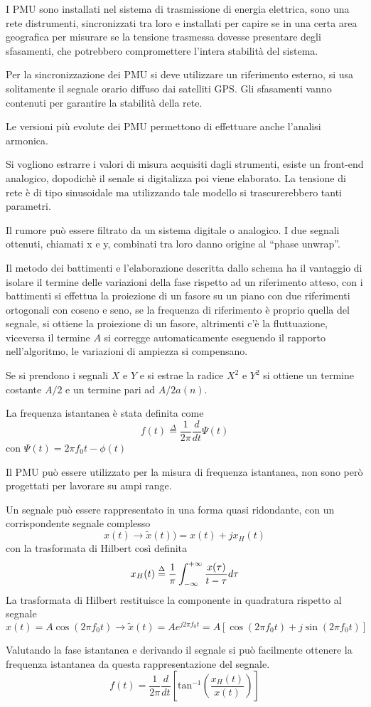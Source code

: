 I PMU sono installati nel sistema di trasmissione di energia elettrica, sono
una rete distrumenti, sincronizzati tra loro e installati per capire se in una
certa area geografica per misurare se la tensione trasmessa dovesse presentare
degli sfasamenti, che potrebbero compromettere l'intera stabilità del sistema.

Per la sincronizzazione dei PMU si deve utilizzare un riferimento esterno, si
usa solitamente il segnale orario diffuso dai satelliti GPS.
Gli sfasamenti vanno contenuti per garantire la stabilità della rete.

Le versioni più evolute dei PMU permettono di effettuare anche l'analisi
armonica.

Si vogliono estrarre i valori di misura acquisiti dagli strumenti, esiste un
front-end analogico, dopodichè il senale si digitalizza poi viene elaborato.
La tensione di rete è di tipo sinusoidale ma utilizzando tale modello si
trascurerebbero tanti parametri.

Il rumore può essere filtrato da un sistema digitale o
analogico.
I due segnali ottenuti, chiamati x e y, combinati tra loro danno origine al
``phase unwrap''.



Il metodo dei battimenti e l'elaborazione descritta dallo schema ha il
vantaggio di isolare il termine delle variazioni della fase rispetto ad un
riferimento atteso, con i battimenti si effettua la proiezione di un fasore su
un piano con due riferimenti ortogonali con coseno e seno, se la frequenza di
riferimento è proprio quella del segnale, si ottiene la proiezione di un
fasore, altrimenti c'è la fluttuazione, viceversa il termine $A$ si corregge
automaticamente eseguendo il rapporto nell'algoritmo, le variazioni di ampiezza
si compensano.

Se si prendono i segnali $X$ e $Y$ e si estrae la radice $X^2$ e $Y^2$ si
ottiene un termine costante $A/2$ e un termine pari ad $A/2a(n)$.

La frequenza istantanea è stata definita come
$$
f(t) \stackrel{\Delta}{=} \frac{1}{2\pi} \frac{d}{dt}\Psi(t)
$$
con $\Psi(t) = 2\pi f_0t - \phi(t)$


Il PMU può essere utilizzato per la misura di frequenza istantanea, non sono
però progettati per lavorare su ampi range.

Un segnale può essere rappresentato in una forma quasi ridondante, con un
corrispondente segnale complesso
$$
x(t) \rightarrow \tilde{x}(t)) = x(t) + jx_H(t)
$$
con la trasformata di Hilbert così definita
$$
x_H(t) \stackrel{\Delta}{=} \frac{1}{\pi}\int_{-\infty}^{+\infty}  \frac{x(\tau)}{t-\tau}d\tau
$$
La trasformata di Hilbert restituisce la componente in quadratura rispetto al
segnale
$$
x(t) = A\cos(2\pi f_0 t) \longrightarrow \tilde{x}(t) = Ae^{j2\pi f_0 t} =
A\left[ \cos(2\pi f_0 t) + j\sin(2\pi f_0 t) \right]
$$

Valutando la fase istantanea e derivando il segnale si può facilmente ottenere
la frequenza istantanea da questa rappresentazione del segnale.
$$
f(t) = \frac{1}{2\pi} \frac{d}{dt} \left[
\text{tan}^{-1}\left(\frac{x_H(t)}{x(t)}\right) \right]
$$

